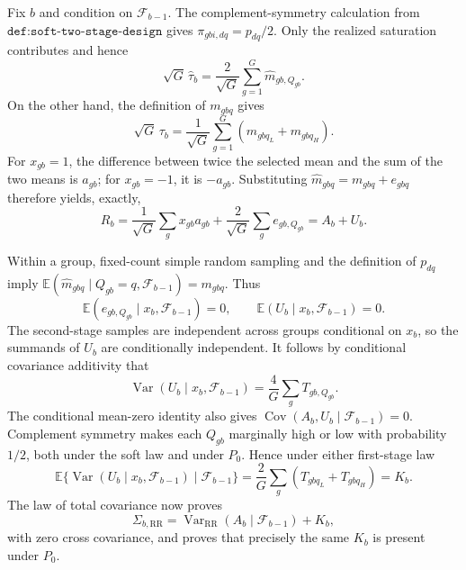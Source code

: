 Fix \(b\) and condition on \(\mathcal F_{b-1}\).  The complement-symmetry calculation from \(\texttt{def:soft-two-stage-design}\) gives \(\pi_{gbi,dq}=p_{dq}/2\).  Only the realized saturation contributes and hence
\[
 \sqrt G\,\widehat\tau_b
 =\frac{2}{\sqrt G}\sum_{g=1}^G\widehat m_{gb,Q_{gb}}.
\]
On the other hand, the definition of \(m_{gbq}\) gives
\[
 \sqrt G\,\tau_b
 =\frac1{\sqrt G}\sum_{g=1}^G(m_{gbq_L}+m_{gbq_H}).
\]
For \(x_{gb}=1\), the difference between twice the selected mean and the sum of the two means is \(a_{gb}\); for \(x_{gb}=-1\), it is \(-a_{gb}\).  Substituting \(\widehat m_{gbq}=m_{gbq}+e_{gbq}\) therefore yields, exactly,
\[
 R_b=\frac1{\sqrt G}\sum_gx_{gb}a_{gb}
       +\frac2{\sqrt G}\sum_ge_{gb,Q_{gb}}=A_b+U_b.
\]

Within a group, fixed-count simple random sampling and the definition of \(p_{dq}\) imply \(\mathbb E(\widehat m_{gbq}\mid Q_{gb}=q,\mathcal F_{b-1})=m_{gbq}\).  Thus
\[
 \mathbb E(e_{gb,Q_{gb}}\mid x_b,\mathcal F_{b-1})=0,
 \qquad
 \mathbb E(U_b\mid x_b,\mathcal F_{b-1})=0.
\]
The second-stage samples are independent across groups conditional on \(x_b\), so the summands of \(U_b\) are conditionally independent.  It follows by conditional covariance additivity that
\[
 \operatorname{Var}(U_b\mid x_b,\mathcal F_{b-1})
 =\frac4G\sum_gT_{gb,Q_{gb}}.
\]
The conditional mean-zero identity also gives
\(\operatorname{Cov}(A_b,U_b\mid\mathcal F_{b-1})=0\).  Complement symmetry makes each \(Q_{gb}\) marginally high or low with probability \(1/2\), both under the soft law and under \(P_0\).  Hence under either first-stage law
\[
 \mathbb E\{\operatorname{Var}(U_b\mid x_b,\mathcal F_{b-1})
          \mid\mathcal F_{b-1}\}
 =\frac2G\sum_g(T_{gbq_L}+T_{gbq_H})=K_b.
\]
The law of total covariance now proves
\[
 \Sigma_{b,\mathrm{RR}}
 =\operatorname{Var}_{\mathrm{RR}}(A_b\mid\mathcal F_{b-1})+K_b,
\]
with zero cross covariance, and proves that precisely the same \(K_b\) is present under \(P_0\).